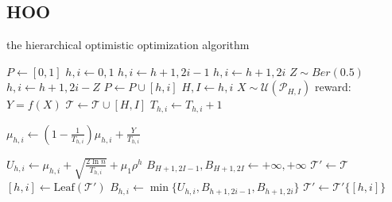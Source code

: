 \documentclass[a4paper,10pt]{article}
\begin{document}
\subsection{HOO}
\begin{algorithm}[!Htop]
	\small
\caption{the hierarchical optimistic optimization algorithm}
\begin{algorithmic}[1]
		\State $P \gets {[0,1]}$
		\State $h,i\gets 0,1$
				\State $h,i \gets h+1,2i-1 $
				\State $h,i \gets h+1,2i $
			\Else
				\State $Z \sim Ber(0.5)$
				\State $h,i \gets h+1,2i-Z$
			\EndIf
			\State $P \gets P \cup {[h,i]}$
		\EndWhile
		\State $H,I \gets h,i$
		\State $X \sim \mathcal{U}(\mathcal{P}_{H,I})$
		\State reward: $Y = f(X)$
		\State $\mathcal{T} \gets \mathcal{T} \cup {[H,I]}$
			\State $T_{h,i} \gets T_{h,i}+1$
			\begin{large}
			\State $\mu_{h,i}\gets (1-\frac{1}{T_{h,i}})\mu_{h,i}+\frac{Y}{T_{h,i}}$
			\end{large}
		\EndFor
			\State $U_{h,i}\gets \mu_{h,i}+\sqrt{\frac{2\ln n}{T_{h,i}}}+\mu_1 \rho^h$
		\EndFor
		\State $B_{H+1,2I-1},B_{H+1,2I} \gets +\infty,+\infty$
		\State $\mathcal{T}' \gets \mathcal{T}$
			\State $[h,i] \gets \text{Leaf}(\mathcal{T}')$
			\State $B_{h,i} \gets \min\{U_{h,i},B_{h+1,2i-1},B_{h+1,2i}\}$
			\State $\mathcal{T}' \gets \mathcal{T}'\{[h,i]\}$
		\EndWhile
	\EndFor
\end{algorithmic}
\end{algorithm}
\end{document}

